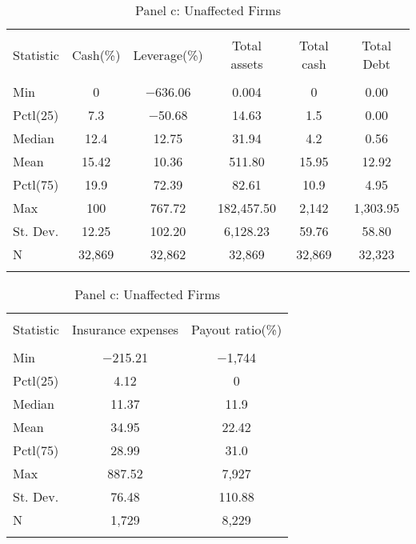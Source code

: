 \begin{table}[!htbp] \centering 
  \caption{Panel c: Unaffected Firms} 
  \label{} 
\begin{tabular}{@{\extracolsep{5pt}}lccccc} 
\\[-1.8ex]\hline 
\hline \\[-1.8ex] 
Statistic & Cash(\%) & Leverage(\%) & Total assets & Total cash & Total Debt \\ 
\hline \\[-1.8ex] 
Min & 0 & $-$636.06 & 0.004 & 0 & 0.00 \\ 
Pctl(25) & 7.3 & $-$50.68 & 14.63 & 1.5 & 0.00 \\ 
Median & 12.4 & 12.75 & 31.94 & 4.2 & 0.56 \\ 
Mean & 15.42 & 10.36 & 511.80 & 15.95 & 12.92 \\ 
Pctl(75) & 19.9 & 72.39 & 82.61 & 10.9 & 4.95 \\ 
Max & 100 & 767.72 & 182,457.50 & 2,142 & 1,303.95 \\ 
St. Dev. & 12.25 & 102.20 & 6,128.23 & 59.76 & 58.80 \\ 
N & 32,869 & 32,862 & 32,869 & 32,869 & 32,323 \\ 
\hline \\[-1.8ex] 
\end{tabular} 
\end{table} 

\begin{table}[!htbp] \centering 
  \caption{Panel c: Unaffected Firms} 
  \label{} 
\begin{tabular}{@{\extracolsep{5pt}}lcc} 
\\[-1.8ex]\hline 
\hline \\[-1.8ex] 
Statistic & Insurance expenses & Payout ratio(\%) \\ 
\hline \\[-1.8ex] 
Min & $-$215.21 & $-$1,744 \\ 
Pctl(25) & 4.12 & 0 \\ 
Median & 11.37 & 11.9 \\ 
Mean & 34.95 & 22.42 \\ 
Pctl(75) & 28.99 & 31.0 \\ 
Max & 887.52 & 7,927 \\ 
St. Dev. & 76.48 & 110.88 \\ 
N & 1,729 & 8,229 \\ 
\hline \\[-1.8ex] 
\end{tabular} 
\end{table} 
